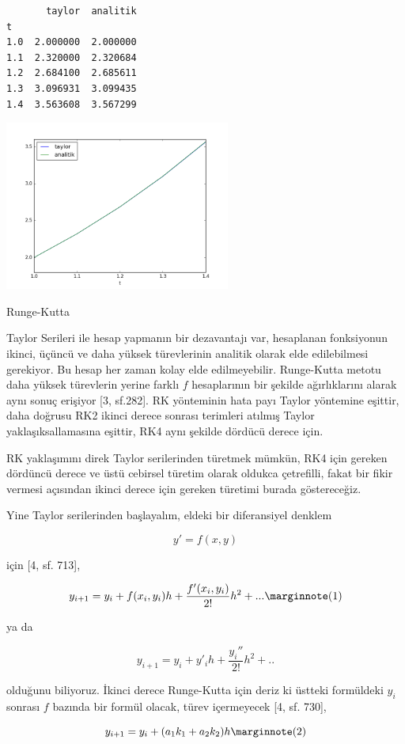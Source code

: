 \documentclass[12pt,fleqn]{article}\usepackage{../../common}
\begin{document}
\begin{verbatim}
       taylor  analitik
t                      
1.0  2.000000  2.000000
1.1  2.320000  2.320684
1.2  2.684100  2.685611
1.3  3.096931  3.099435
1.4  3.563608  3.567299
\end{verbatim}

\includegraphics[width=20em]{2_7.png}

Runge-Kutta

Taylor Serileri ile hesap yapmanın bir dezavantajı var, hesaplanan fonksiyonun
ikinci, üçüncü ve daha yüksek türevlerinin analitik olarak elde edilebilmesi
gerekiyor. Bu hesap her zaman kolay elde edilmeyebilir. Runge-Kutta metotu daha
yüksek türevlerin yerine farklı $f$ hesaplarının bir şekilde ağırlıklarını
alarak aynı sonuç erişiyor [3, sf.282]. RK yönteminin hata payı Taylor yöntemine
eşittir, daha doğrusu RK2 ikinci derece sonrası terimleri atılmış Taylor
yaklaşıksallamasına eşittir, RK4 aynı şekilde dördücü derece için.

RK yaklaşımını direk Taylor serilerinden türetmek mümkün, RK4 için gereken
dördüncü derece ve üstü cebirsel türetim olarak oldukca çetrefilli, fakat bir
fikir vermesi açısından ikinci derece için gereken türetimi burada göstereceğiz.

Yine Taylor serilerinden başlayalım, eldeki bir diferansiyel denklem

$$
y' = f(x,y)
$$

için [4, sf. 713],

$$
y_{i+1} = y_i + f(x_i,y_i) h + \frac{f'(x_i,y_i)}{2!} h^2 + ...
\mlabel{1}
$$

ya da

$$
y_{i+1} = y_i + y'_i h + \frac{y_i''}{2!} h^2 + ..
$$

olduğunu biliyoruz. İkinci derece Runge-Kutta için deriz ki üstteki formüldeki
$y_i$ sonrası $f$ bazında bir formül olacak, türev içermeyecek [4, sf. 730],

$$
y_{i+1} = y_i + (a_1 k_1 + a_2 k_2) h
\mlabel{2}
$$
\end{document}
